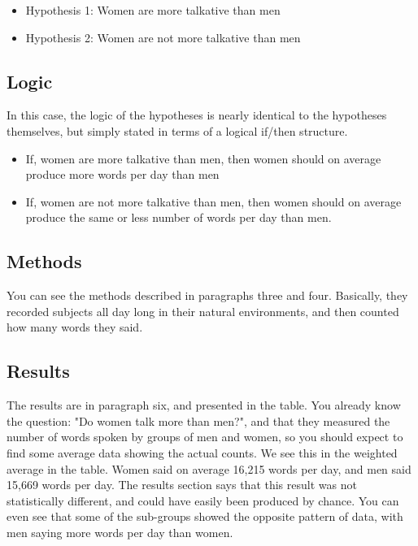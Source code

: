 \begin{itemize}
\item Hypothesis 1: Women are more talkative than men
\item Hypothesis 2: Women are not more talkative than men
\end{itemize}

\subsection{Logic}

In this case, the logic of the hypotheses is nearly identical to the hypotheses themselves, but simply stated in terms of a logical if/then structure.

\begin{itemize}
\item If, women are more talkative than men, then women should on average produce more words per day than men
\item If, women are not more talkative than men, then women should on average produce the same or less number of words per day than men.
\end{itemize}

\subsection{Methods}

You can see the methods described in paragraphs three and four. Basically, they recorded subjects all day long in their natural environments, and then counted how many words they said.

\subsection{Results}

The results are in paragraph six, and presented in the table. You already know the question: "Do women talk more than men?", and that they measured the number of words spoken by groups of men and women, so you should expect to find some average data showing the actual counts. We see this in the weighted average in the table. Women said on average 16,215 words per day, and men said 15,669 words per day. The results section says that this result was not statistically different, and could have easily been produced by chance. You can even see that some of the sub-groups showed the opposite pattern of data, with men saying more words per day than women.

